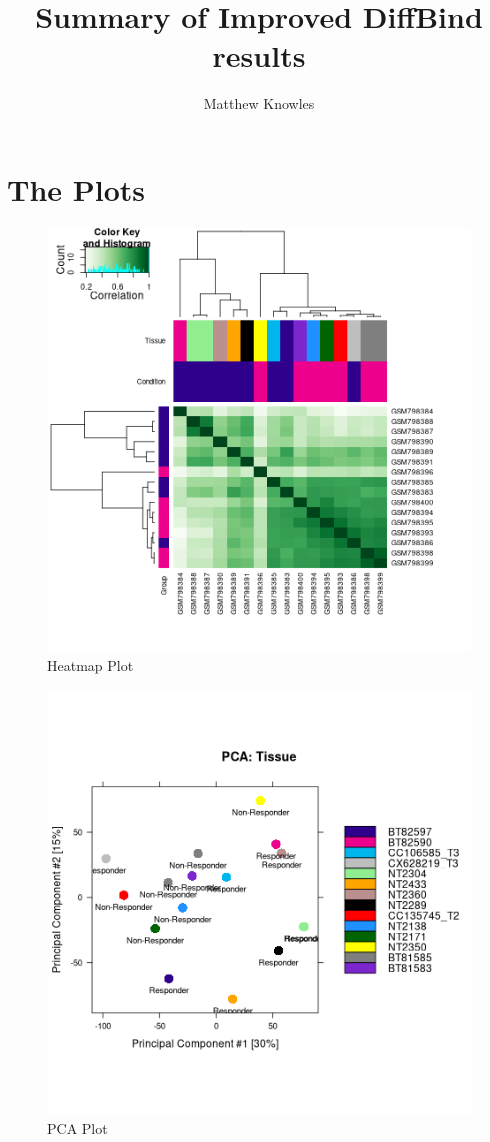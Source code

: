 \documentclass{article}
\title{Summary of Improved DiffBind results}
\author{Matthew Knowles}
\date{}
\begin{document}
\maketitle

\section{The Plots}
\begin{figure}[h]
\centering
\includegraphics*[scale=0.9]{figures/hmpdata.png}
\caption{Heatmap Plot}
\end{figure}

\newpage

\begin{figure}
\centering
\caption{PCA Plot}
\includegraphics*{figures/pcadata.png}
\end{figure}
\end{document}
